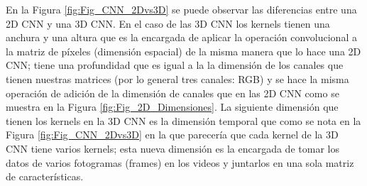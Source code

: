 \begin{onehalfspacing}
En la Figura \ref{fig:Fig_CNN_2Dvs3D} se puede observar las diferencias entre una 2D CNN y una 3D CNN. En el caso de las 3D CNN los kernels tienen una anchura y una altura que es la encargada de aplicar la operación convolucional a la matriz de píxeles (dimensión espacial) de la misma manera que lo hace una 2D CNN; tiene una profundidad que es igual a la la dimensión de los canales que tienen nuestras matrices (por lo general tres canales: RGB) y se hace la misma operación de adición de la dimensión de canales que en las 2D CNN como se muestra en la Figura \ref{fig:Fig_2D_Dimensiones}. La siguiente dimensión que tienen los kernels en la 3D CNN es la dimensión temporal que como se nota en la Figura \ref{fig:Fig_CNN_2Dvs3D} en la que parecería que cada kernel de la 3D CNN  tiene varios kernels; esta nueva dimensión es la encargada de tomar los datos de varios fotogramas (frames) en los videos y juntarlos en una sola matriz de características.\\ 


\end{onehalfspacing}
